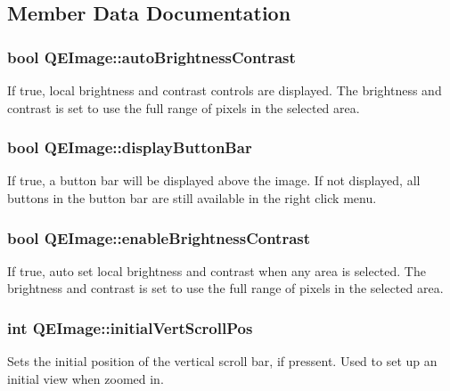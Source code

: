 \subsection{Member Data Documentation}
\hypertarget{classQEImage_a628f5be86f9bc38c167f21d740f7b86e}{
\subsubsection[{autoBrightnessContrast}]{\setlength{\rightskip}{0pt plus 5cm}bool {\bf QEImage::autoBrightnessContrast}}}
\label{classQEImage_a628f5be86f9bc38c167f21d740f7b86e}
If true, local brightness and contrast controls are displayed. The brightness and contrast is set to use the full range of pixels in the selected area. \hypertarget{classQEImage_a5d25b289ae57a8848e13816c62def90a}{
\subsubsection[{displayButtonBar}]{\setlength{\rightskip}{0pt plus 5cm}bool {\bf QEImage::displayButtonBar}}}
\label{classQEImage_a5d25b289ae57a8848e13816c62def90a}
If true, a button bar will be displayed above the image. If not displayed, all buttons in the button bar are still available in the right click menu. \hypertarget{classQEImage_a8d593efab178653a7275b78e22da4fdf}{
\subsubsection[{enableBrightnessContrast}]{\setlength{\rightskip}{0pt plus 5cm}bool {\bf QEImage::enableBrightnessContrast}}}
\label{classQEImage_a8d593efab178653a7275b78e22da4fdf}
If true, auto set local brightness and contrast when any area is selected. The brightness and contrast is set to use the full range of pixels in the selected area. \hypertarget{classQEImage_af4af8618263670a539f5f42f69378256}{
\subsubsection[{initialVertScrollPos}]{\setlength{\rightskip}{0pt plus 5cm}int {\bf QEImage::initialVertScrollPos}}}
\label{classQEImage_af4af8618263670a539f5f42f69378256}
Sets the initial position of the vertical scroll bar, if pressent. Used to set up an initial view when zoomed in. 

